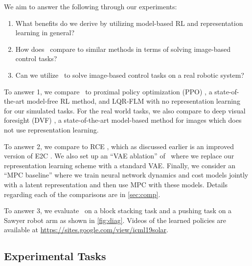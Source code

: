 We aim to answer the following through our experiments:
\vspace{-.5em}
\begin{enumerate}
    \itemsep0em
    \item What benefits do we derive by utilizing model-based RL and representation learning in general?
    \item How does \metabbr\ compare to similar methods in terms of solving image-based control tasks?
    \item Can we utilize \metabbr\ to solve image-based control tasks on a real robotic system?
\end{enumerate}
\vspace{-.5em}
To answer 1, we compare \metabbr\ to proximal policy optimization (PPO) \citep{ppo}, a state-of-the-art model-free RL method, and LQR-FLM with no representation learning for our simulated tasks. For the real world tasks, we also compare to deep visual foresight (DVF) \citep{vf}, a state-of-the-art model-based method for images which does not use representation learning.

To answer 2, we compare to RCE \citep{rce}, which as discussed earlier is an improved version of E2C \citep{e2c}. We also set up an ``VAE ablation'' of \metabbr\ where we replace our representation learning scheme with a standard VAE. Finally, we consider an ``MPC baseline'' where we train neural network dynamics and cost models jointly with a latent representation and then use MPC with these models. Details regarding each of the comparisons are in \autoref{sec:comp}.

To answer 3, we evaluate \metabbr\ on a block stacking task and a pushing task on a Sawyer robot arm as shown in \autoref{fig:diag}. Videos of the learned policies are available at \mbox{\footnotesize{\url{https://sites.google.com/view/icml19solar}}.}

\subsection{Experimental Tasks}


